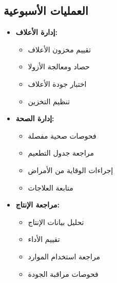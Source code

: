 \subsection{العمليات الأسبوعية}
\begin{itemize}
    \item \textbf{إدارة الأعلاف:}
    \begin{itemize}
        \item تقييم مخزون الأعلاف
        \item حصاد ومعالجة الأزولا
        \item اختبار جودة الأعلاف
        \item تنظيم التخزين
    \end{itemize}
    
    \item \textbf{إدارة الصحة:}
    \begin{itemize}
        \item فحوصات صحية مفصلة
        \item مراجعة جدول التطعيم
        \item إجراءات الوقاية من الأمراض
        \item متابعة العلاجات
    \end{itemize}
    
    \item \textbf{مراجعة الإنتاج:}
    \begin{itemize}
        \item تحليل بيانات الإنتاج
        \item تقييم الأداء
        \item مراجعة استخدام الموارد
        \item فحوصات مراقبة الجودة
    \end{itemize}
\end{itemize}

